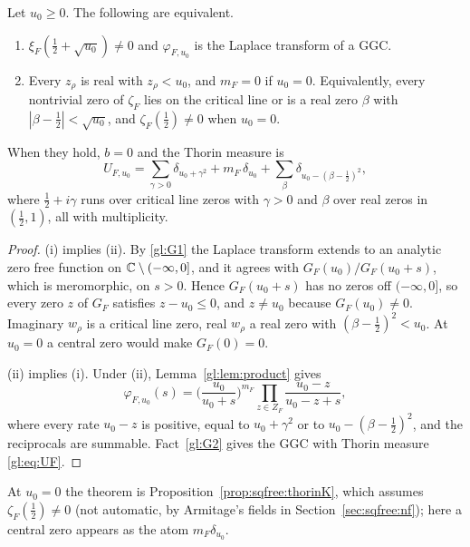 \begin{theorem}\label{gl:thm:family}
Let $u_0\ge0$. The following are equivalent.
\begin{enumerate}
\item[(i)] $\xi_F(\tfrac12+\sqrt{u_0})\neq0$ and $\varphi_{F,u_0}$ is the Laplace transform of a GGC.
\item[(ii)] Every $z_\rho$ is real with $z_\rho<u_0$, and $m_F=0$ if $u_0=0$. Equivalently, every nontrivial zero of $\zeta_F$ lies on the critical line or is a real zero $\beta$ with $|\beta-\tfrac12|<\sqrt{u_0}$, and $\zeta_F(\tfrac12)\neq0$ when $u_0=0$.
\end{enumerate}
When they hold, $b=0$ and the Thorin measure is
\begin{equation}\label{gl:eq:UF}
U_{F,u_0}=\sum_{\gamma>0}\delta_{u_0+\gamma^2}+m_F\,\delta_{u_0}+\sum_\beta\delta_{u_0-(\beta-\frac12)^2},
\end{equation}
where $\tfrac12+i\gamma$ runs over critical line zeros with $\gamma>0$ and $\beta$ over real zeros in $(\tfrac12,1)$, all with multiplicity.
\end{theorem}

\begin{proof}
(i) implies (ii). By \ref{gl:G1} the Laplace transform extends to an analytic zero free function on $\mathbb{C}\setminus(-\infty,0]$, and it agrees with $G_F(u_0)/G_F(u_0+s)$, which is meromorphic, on $s>0$. Hence $G_F(u_0+s)$ has no zeros off $(-\infty,0]$, so every zero $z$ of $G_F$ satisfies $z-u_0\le0$, and $z\neq u_0$ because $G_F(u_0)\neq0$. Imaginary $w_\rho$ is a critical line zero, real $w_\rho$ a real zero with $(\beta-\tfrac12)^2<u_0$. At $u_0=0$ a central zero would make $G_F(0)=0$.

(ii) implies (i). Under (ii), Lemma~\ref{gl:lem:product} gives
\[
\varphi_{F,u_0}(s)=\Big(\frac{u_0}{u_0+s}\Big)^{m_F}\prod_{z\in Z_F}\frac{u_0-z}{u_0-z+s},
\]
where every rate $u_0-z$ is positive, equal to $u_0+\gamma^2$ or to $u_0-(\beta-\tfrac12)^2$, and the reciprocals are summable. Fact~\ref{gl:G2} gives the GGC with Thorin measure \eqref{gl:eq:UF}.
\end{proof}

At $u_0=0$ the theorem is Proposition~\ref{prop:sqfree:thorinK}, which assumes $\zeta_F(\tfrac12)\ne0$ (not automatic, by Armitage's fields in Section~\ref{sec:sqfree:nf}); here a central zero appears as the atom $m_F\delta_{u_0}$.

